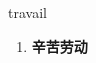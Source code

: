 
\begin{frame}
{\huge travail}
\begin{center}
\begin{enumerate}\Large
  \item \textbf{辛苦劳动}
\end{enumerate}
\end{center}
\end{frame}
